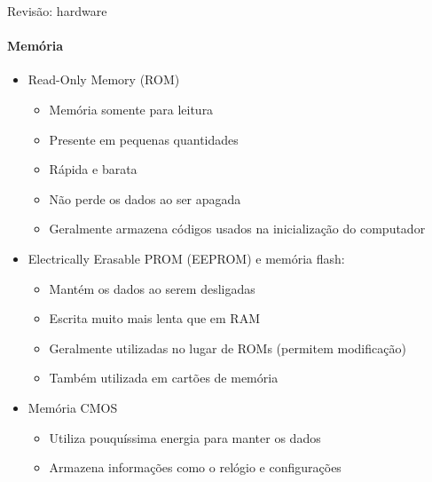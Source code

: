 \documentclass{beamer}
\begin{document}
\begin{frame}{Revisão: hardware}
	\framesubtitle{Memória}
	\begin{itemize}
		\item Read-Only Memory (ROM)
		\begin{itemize}
			\item Memória somente para leitura
			\item Presente em pequenas quantidades
			\item Rápida e barata
			\item Não perde os dados ao ser apagada
			\item Geralmente armazena códigos usados na inicialização do computador
		\end{itemize}
		\item Electrically Erasable PROM (EEPROM) e memória flash:
		\begin{itemize}
			\item Mantém os dados ao serem desligadas
			\item Escrita muito mais lenta que em RAM
			\item Geralmente utilizadas no lugar de ROMs (permitem modificação)
			\item Também utilizada em cartões de memória
		\end{itemize}
		\item Memória CMOS
		\begin{itemize}
			\item Utiliza pouquíssima energia para manter os dados
			\item Armazena informações como o relógio e configurações
		\end{itemize}
	\end{itemize}
\end{frame}
\end{document}
